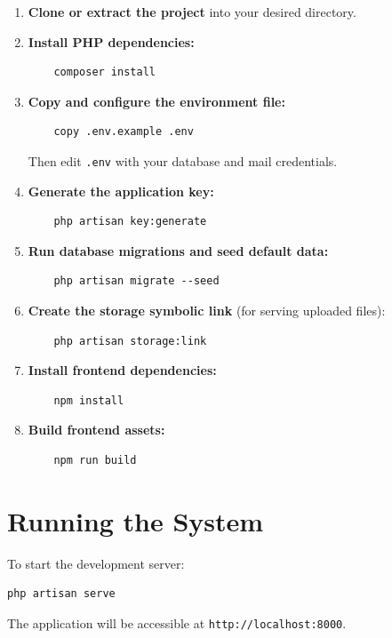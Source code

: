 \begin{enumerate}
    \item \textbf{Clone or extract the project} into your desired directory.
    \item \textbf{Install PHP dependencies:}
    \begin{verbatim}
    composer install
    \end{verbatim}
    \item \textbf{Copy and configure the environment file:}
    \begin{verbatim}
    copy .env.example .env
    \end{verbatim}
    Then edit \texttt{.env} with your database and mail credentials.
    \item \textbf{Generate the application key:}
    \begin{verbatim}
    php artisan key:generate
    \end{verbatim}
    \item \textbf{Run database migrations and seed default data:}
    \begin{verbatim}
    php artisan migrate --seed
    \end{verbatim}
    \item \textbf{Create the storage symbolic link} (for serving uploaded files):
    \begin{verbatim}
    php artisan storage:link
    \end{verbatim}
    \item \textbf{Install frontend dependencies:}
    \begin{verbatim}
    npm install
    \end{verbatim}
    \item \textbf{Build frontend assets:}
    \begin{verbatim}
    npm run build
    \end{verbatim}
\end{enumerate}

\section{Running the System}

To start the development server:

\begin{verbatim}
php artisan serve
\end{verbatim}

The application will be accessible at \texttt{http://localhost:8000}.

